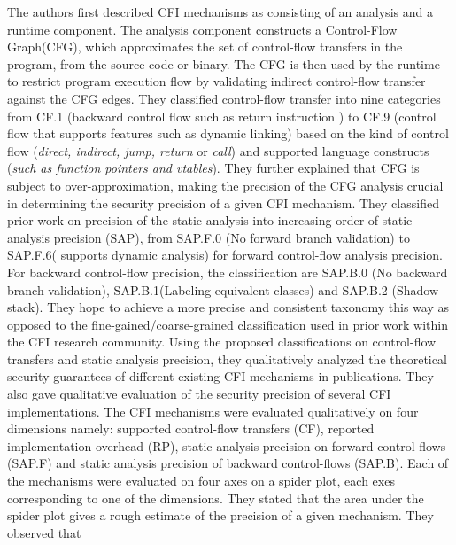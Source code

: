 \documentclass[dvips,12pt]{article}
\begin{document}
The authors first described CFI mechanisms as consisting of an analysis and a runtime component. The analysis component constructs a Control-Flow Graph(CFG), which approximates the set of control-flow transfers in the program, from the source code or binary. The CFG is then used by the runtime to restrict program execution flow by validating indirect control-flow transfer against the CFG edges. They classified control-flow transfer into nine categories from CF.1 (backward control flow such as return instruction ) to CF.9 (control flow that supports features such as dynamic linking) based on the kind of control flow (\textit{direct, indirect, jump, return} or \textit{call}) and supported language constructs (\textit{such as function pointers and vtables}). They further explained that CFG is subject to over-approximation, making the precision of the CFG analysis crucial in determining the security precision of a given CFI mechanism. They classified prior work on precision of the static analysis into increasing order of static analysis precision (SAP), from SAP.F.0 (No forward branch validation) to SAP.F.6( supports dynamic analysis) for forward control-flow analysis precision. For backward control-flow precision, the classification are SAP.B.0 (No backward branch validation), SAP.B.1(Labeling equivalent classes) and SAP.B.2 (Shadow stack). They hope to achieve a more precise and consistent taxonomy this way as opposed to the fine-gained/coarse-grained classification used in prior work within the CFI research community.  
\newline
\newline
Using the proposed classifications on control-flow transfers and static analysis precision, they qualitatively analyzed the theoretical security guarantees of different existing CFI mechanisms in publications. They also gave qualitative evaluation of the security precision of several CFI implementations. The CFI mechanisms were evaluated qualitatively on four dimensions namely: supported control-flow transfers (CF), reported implementation overhead (RP), static analysis precision on forward control-flows (SAP.F) and static analysis precision of backward control-flows (SAP.B). Each of the mechanisms were evaluated on four axes on a spider plot, each exes corresponding to one of the dimensions. They stated that the area under the spider plot gives a rough estimate of the precision of a given mechanism. They observed that 






 





\end{document}

